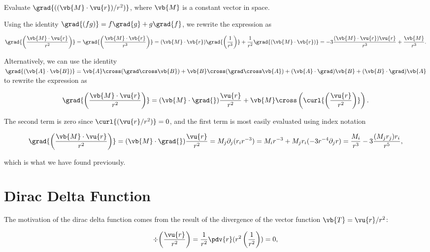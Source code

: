 \documentclass[english,a4paper,12pt]{report}
\begin{document}
{Evaluate \(\grad{((\vb{M} \cdot \vu{r} )/r^2)} \), where \(\vb{M} \) is a constant vector in space.  }
{Using the identity \(\grad{(fg)} = f \grad{g} + g\grad{f}  \), we rewrite the expression as 

\begin{equation}
	\grad{\left( \frac{\vb{M} \cdot \vu{r} }{r^2}  \right) } = \grad{\left( \frac{\vb{M} \cdot \vb{r} }{r^3 }  \right)} = (\vb{M} \cdot \vb{r}  ) \grad{\left( \frac{1}{r^3}  \right)} + \frac{1}{r^2} \grad{(\vb{M} \cdot \vb{r}  )} = -3 \frac{(\vb{M} \cdot \vu{r} )\vu{r} }{r^3 } + \frac{\vb{M} }{r^3}.  
\end{equation}

Alternatively, we can use the identity \(\grad{(\vb{A} \cdot \vb{B})} = \vb{A} \cross (\grad \cross \vb{B}) + \vb{B} \cross (\grad \cross \vb{A}) + (\vb{A} \cdot \grad)\vb{B} + (\vb{B} \cdot \grad)\vb{A}\) to rewrite the expression as 

\begin{equation}
	\grad{\left( \frac{\vb{M} \cdot \vu{r} }{r^2}  \right)} = (\vb{M} \cdot \grad{} )\frac{\vu{r} }{r^2} + \vb{M} \cross \left(\curl{\left( \frac{\vu{r} }{r^2}  \right)} \right).
\end{equation}

The second term is zero since \(\curl{(\vu{r} /r^2)} = 0\), and the first term is most easily evaluated using index notation

\begin{equation}
	\grad{\left( \frac{\vb{M} \cdot \vu{r} }{r^2}  \right)} = (\vb{M} \cdot \grad{} )\frac{\vu{r} }{r^2} = M_{j}\partial _{j}(r_{i}r^{-3} ) = M_{i} r^{-3} + M_{j}r_{i} (-3r^{-4}\partial _{j}r ) = \frac{M_{i} }{r^3 } - 3 \frac{(M_{j} r_{j} )r_{i} }{r^5},     
\end{equation}

which is what we have found previously.
} 


	
\section{Dirac Delta Function}
	
The motivation of the dirac delta function comes from the result of the divergence of the vector function \( \vb{T} = \vu{r}  /r^2\):
	
\begin{equation} 
	\div{\left(\frac{\vu{r}}{r^2}\right)} = \frac{1}{r^2} \pdv{r}(r^2\left(\frac{1}{r^2}\right)) = 0, \label{notmatchone} 
\end{equation}
	
\end{document}
